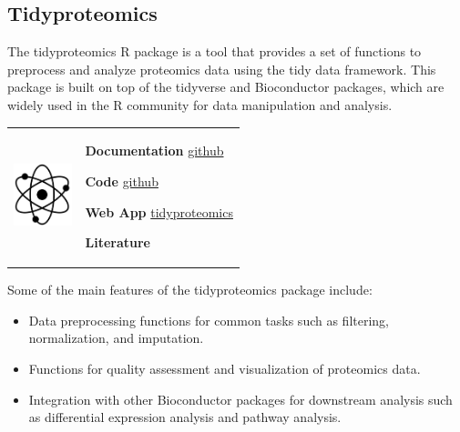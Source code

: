\documentclass[
]{book}
\providecommand{\tightlist}{%
  \setlength{\itemsep}{0pt}\setlength{\parskip}{0pt}}
\begin{document}
\hypertarget{tidyproteomics}{%
\subsection*{Tidyproteomics}\label{tidyproteomics}}

The tidyproteomics R package is a tool that provides a set of functions to preprocess and analyze proteomics data using the tidy data framework. This package is built on top of the tidyverse and Bioconductor packages, which are widely used in the R community for data manipulation and analysis.

\hfill\break

\begin{longtable}[]{@{}
  >{\raggedright\arraybackslash}p{}
  >{\raggedright\arraybackslash}p{}@{}}
\toprule\noalign{}
\endhead
\bottomrule\noalign{}
\endlastfoot
\includegraphics[width=\textwidth,height=0.70833in]{images/05.png} & \textbf{Documentation} \textbar{} \href{https://jeffsocal.github.io/tidyproteomics/}{github}

\textbf{Code} \textbar{} \href{https://github.com/jeffsocal/tidyproteomics}{github}

\textbf{Web App} \textbar{} \href{bioinformatics.pel.caltech.edu/tidyproteomics/}{tidyproteomics}

\textbf{Literature} \\
\end{longtable}

\hfill\break

Some of the main features of the tidyproteomics package include:

\begin{itemize}
\tightlist
\item
  Data preprocessing functions for common tasks such as filtering, normalization, and imputation.
\item
  Functions for quality assessment and visualization of proteomics data.
\item
  Integration with other Bioconductor packages for downstream analysis such as differential expression analysis and pathway analysis.
\end{itemize}
\end{document}
